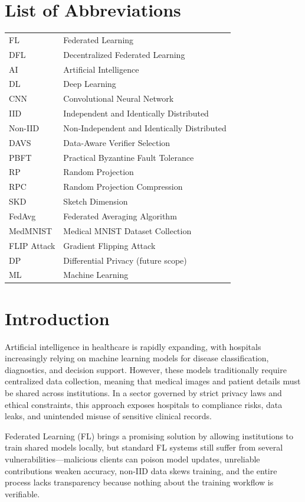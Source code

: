 \documentclass[12pt,a4paper]{article}
\begin{document}
\newpage
\tableofcontents
\newpage
\listoffigures
\newpage
\listoftables

\newpage
\section*{List of Abbreviations}
\begin{tabular}{ll}
FL & Federated Learning \\
DFL & Decentralized Federated Learning \\
AI & Artificial Intelligence \\
DL & Deep Learning \\
CNN & Convolutional Neural Network \\
IID & Independent and Identically Distributed \\
Non-IID & Non-Independent and Identically Distributed \\
DAVS & Data-Aware Verifier Selection \\
PBFT & Practical Byzantine Fault Tolerance \\
RP & Random Projection \\
RPC & Random Projection Compression \\
SKD & Sketch Dimension \\
FedAvg & Federated Averaging Algorithm \\
MedMNIST & Medical MNIST Dataset Collection \\
FLIP Attack & Gradient Flipping Attack \\
DP & Differential Privacy (future scope) \\
ML & Machine Learning \\
\end{tabular}

\newpage
\section{Introduction}
Artificial intelligence in healthcare is rapidly expanding, with hospitals increasingly relying on machine learning models for disease classification, diagnostics, and decision support. However, these models traditionally require centralized data collection, meaning that medical images and patient details must be shared across institutions. In a sector governed by strict privacy laws and ethical constraints, this approach exposes hospitals to compliance risks, data leaks, and unintended misuse of sensitive clinical records.

Federated Learning (FL) brings a promising solution by allowing institutions to train shared models locally, but standard FL systems still suffer from several vulnerabilities---malicious clients can poison model updates, unreliable contributions weaken accuracy, non-IID data skews training, and the entire process lacks transparency because nothing about the training workflow is verifiable.
\end{document}
